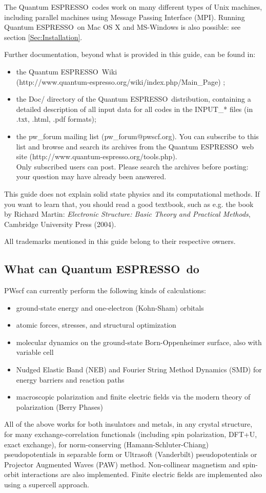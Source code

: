 \documentclass[12pt,a4paper]{article}
\def\qe{{\sc Quantum ESPRESSO}}
\begin{document}
The \qe\ codes work on many different types of 
Unix machines,
including parallel machines using Message Passing Interface (MPI).
Running \qe\ on Mac OS X and MS-Windows is also possible: 
see section \ref{Sec:Installation}.

Further documentation, beyond what is provided in this guide, can be found in:
\begin{itemize}
  \item the \qe\ Wiki\\
   (http://www.quantum-espresso.org/wiki/index.php/Main\_Page) ;
  \item the Doc/ directory of the \qe\ distribution,
   containing a detailed description of all input data for all codes
   in the INPUT\_* files (in .txt, .html, .pdf formats);
\item the pw\_forum mailing list (pw\_forum@pwscf.org).
   You can subscribe to this list and browse and search its archives 
   from the \qe\ web site 
   (http://www.quantum-espresso.org/tools.php).\\
   Only subscribed users can post. Please search the archives 
   before posting: your question may have already been answered.
\end{itemize}

This guide does not explain solid state physics and its computational methods.
If you want to learn that, you should read a good textbook, such as e.g.
the book by Richard Martin:
{\em Electronic Structure: Basic Theory and Practical Methods},
Cambridge University Press (2004).

All trademarks mentioned in this guide belong to their respective owners.

\subsection{What can \qe\ do}

PWscf can currently perform the following kinds of calculations:
\begin{itemize}
  \item ground-state energy and one-electron (Kohn-Sham) orbitals
  \item atomic forces, stresses, and structural optimization
  \item molecular dynamics on the ground-state Born-Oppenheimer surface, 
   also with variable cell
  \item Nudged Elastic Band (NEB) and Fourier String Method Dynamics (SMD)
  for energy barriers and reaction paths
  \item macroscopic polarization and finite electric fields via 
  the modern theory of polarization (Berry Phases)
\end{itemize}
All of the above works for both insulators and metals, 
in any crystal structure, for many exchange-correlation functionals
(including spin polarization, DFT+U, exact exchange), for
norm-conserving (Hamann-Schluter-Chiang) pseudopotentials in 
separable form or Ultrasoft (Vanderbilt) pseudopotentials 
or Projector Augmented Waves (PAW) method.
Non-collinear magnetism and spin-orbit interactions 
are also implemented.  
Finite electric fields are implemented also using a supercell approach.
\end{document}
